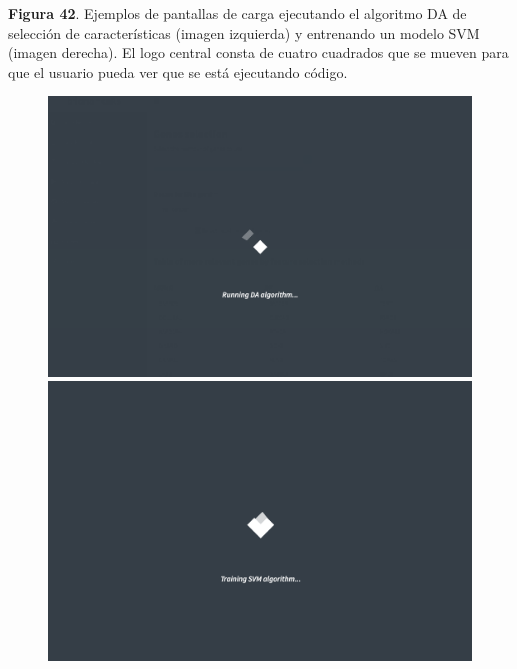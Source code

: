 \newpage
\begin{center}
	\textbf{Figura 42}. Ejemplos de pantallas de carga ejecutando el algoritmo DA de selección de características (imagen izquierda) y entrenando un modelo SVM (imagen derecha). El logo central consta de cuatro cuadrados que se mueven para que el usuario pueda ver que se está ejecutando código.


\begin{figure}[H]
	\centering
	\begin{minipage}{.5\textwidth}
		\centering
		\includegraphics[width=.95\textwidth]{figuras/42_spinner_2.png}
	\end{minipage}%
	\begin{minipage}{.5\textwidth}
		\centering
		\includegraphics[width=.95\textwidth]{figuras/42_spinner_1.png}
	\end{minipage}
\end{figure}

\end{center}

